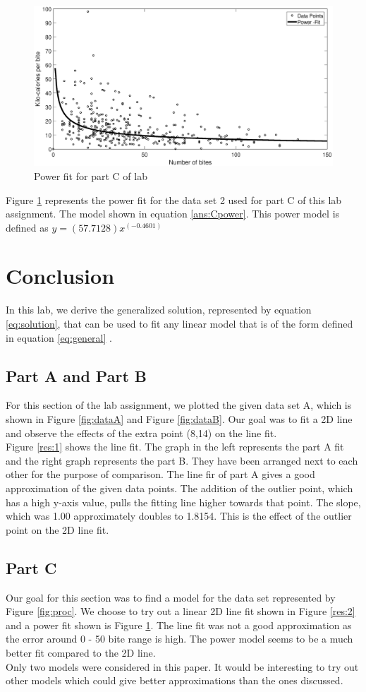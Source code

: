 \documentclass[12pt]{article}
\begin{document}
\begin{figure}[h]
\centering
	\includegraphics[scale=0.32]{resCpower}
	\caption{Power fit for part C of lab }
	\label{res:3}
\end{figure}
\noindent
Figure \ref{res:3} represents the power fit for the data set 2 used for part C of this lab assignment. The model shown in equation \ref{ans:Cpower}. This power model is defined as  $y = (57.7128)x^{(-0.4601)}$

\section{Conclusion}
In this lab, we derive the generalized solution, represented by equation \ref{eq:solution}, that can be used to fit any linear model that is of the form defined in equation \ref{eq:general} .
\subsection{Part A and Part B}
For this section of the lab assignment, we plotted the given data set A, which is shown in Figure \ref{fig:dataA} and Figure \ref{fig:dataB}. Our goal was to fit a 2D line and observe the effects of the extra point (8,14) on the line fit. \\
Figure \ref{res:1} shows the line fit. The graph in the left represents the part A fit and the right graph represents the part B. They have been arranged next to each other for the purpose of comparison. The line fir of part A gives a good approximation of the given data points. The addition of the outlier point, which has a high y-axis value, pulls the fitting line higher towards that point. The slope, which was 1.00 approximately doubles to 1.8154. This is the effect of the outlier point on the 2D line fit. 
\subsection{Part C}
Our goal for this section was to find a model for the data set represented by Figure \ref{fig:proc}. We choose to try out a linear 2D line fit shown in Figure \ref{res:2} and a power fit shown is Figure \ref{res:3}. The line fit was not a good approximation as the error around 0 - 50 bite range is high. The power model seems to be a much better fit compared to the 2D line. \\ Only two models were considered in this paper. It would be interesting to try out other models which could give better approximations than the ones discussed. 
\end{document}
